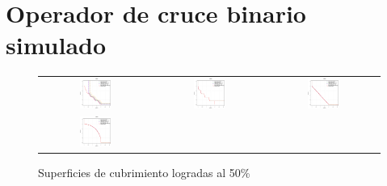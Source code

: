 \chapter{Operador de cruce binario simulado} %

\label{AppendixC} %

 \begin{figure}%
 \centering
 \caption{Superficies de cubrimiento logradas al 50\%}
 \label{fig:Attainment_Surfaces_State_Art}
 \begin{tabular}{ccc}
    \includegraphics[width=0.3\textwidth]{Figures_Chapter7/Results_Chapter5/WFG1.eps} &
    \includegraphics[width=0.3\textwidth]{Figures_Chapter7/Results_Chapter5/WFG2.eps} &
    \includegraphics[width=0.3\textwidth]{Figures_Chapter7/Results_Chapter5/WFG3.eps} \\
    \includegraphics[width=0.3\textwidth]{Figures_Chapter7/Results_Chapter5/WFG4.eps} &

\end{tabular}
\end{figure}

